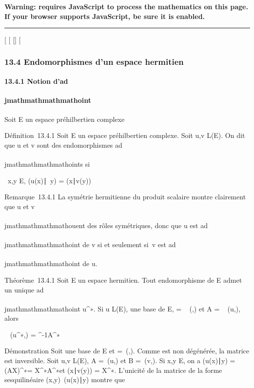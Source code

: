 \textbf{Warning: 
requires JavaScript to process the mathematics on this page.\\ If your
browser supports JavaScript, be sure it is enabled.}

\begin{center}\rule{3in}{0.4pt}\end{center}

{[}
{[}
{[}{]}
{[}

\subsubsection{13.4 Endomorphismes d'un espace hermitien}

\paragraph{13.4.1 Notion d'ad\\\\jmathmathmathmathoint}

Soit E un espace préhilbertien complexe

Définition~13.4.1 Soit E un espace préhilbertien complexe. Soit u,v \in
L(E). On dit que u et v sont des endomorphismes ad\\\\jmathmathmathmathoints si

\forall~x,y \in E, (u(x)\mathrel∣~y)
= (x∣v(y))

Remarque~13.4.1 La symétrie hermitienne du produit scalaire montre
clairement que u et v \\\\jmathmathmathmathouent des rôles symétriques, donc que u est
ad\\\\jmathmathmathmathoint de v si et seulement si~v est ad\\\\jmathmathmathmathoint de u.

Théorème~13.4.1 Soit E un espace hermitien. Tout endomorphisme de E
admet un unique ad\\\\jmathmathmathmathoint u^∗. Si u \in L(E),  une base de E, \Omega
= \mathrmMat~ (\phi,) et A
= \mathrmMat~ (u,), alors

\mathrmMat~
(u^∗,) = \Omega^-1A^∗\Omega

Démonstration Soit  une base de E et \Omega =\
\mathrmMat (\phi,). Comme \phi est non dégénérée, la
matrice \Omega est inversible. Soit u,v \in L(E), A =\
\mathrmMat (u,) et B =\
\mathrmMat (v,). Si x,y \in E, on a
(u(x)∣y) = (AX)^∗\OmegaY =
X^∗A^∗\OmegaY et (x∣v(y)) =
X^∗\OmegaBY . L'unicité de la matrice de la forme sesquilinéaire
(x,y)\mapsto~(u(x)\mathrel∣y)
montre que

